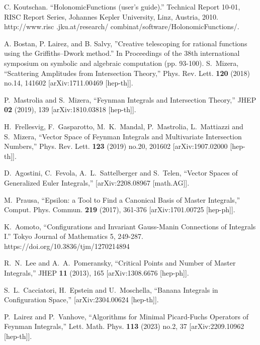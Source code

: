 \documentclass[a4paper,12pt]{article}
\numberwithin{equation}{section}
\numberwithin{figure}{section}
\begin{document}
\begin{thebibliography}{99}
 C. Koutschan. ``HolonomicFunctions (user's guide).'' Technical Report 10-01, RISC Report Series, Johannes Kepler University, Linz, Austria, 2010. http://www.risc
.jku.at/research/ combinat/software/HolonomicFunctions/.

 A. Bostan, P. Lairez, and B. Salvy,
  ''Creative telescoping for rational functions using the
  Griffiths--Dwork method.'' In Proceedings of the 38th international
  symposium on symbolic and algebraic computation (pp. 93-100). 
S.~Mizera,
``Scattering Amplitudes from Intersection Theory,''
Phys. Rev. Lett. \textbf{120} (2018) no.14, 141602
[arXiv:1711.00469 [hep-th]].

P.~Mastrolia and S.~Mizera,
``Feynman Integrals and Intersection Theory,''
JHEP \textbf{02} (2019), 139
[arXiv:1810.03818 [hep-th]].

H.~Frellesvig, F.~Gasparotto, M.~K.~Mandal, P.~Mastrolia, L.~Mattiazzi and S.~Mizera,
``Vector Space of Feynman Integrals and Multivariate Intersection Numbers,''
Phys. Rev. Lett. \textbf{123} (2019) no.20, 201602
[arXiv:1907.02000 [hep-th]].

D.~Agostini, C.~Fevola, A.~L.~Sattelberger and S.~Telen,
``Vector Spaces of Generalized Euler Integrals,''
[arXiv:2208.08967 [math.AG]].

  
M.~Prausa,
``Epsilon: a Tool to Find a Canonical Basis of Master Integrals,''
Comput. Phys. Commun. \textbf{219} (2017), 361-376
[arXiv:1701.00725 [hep-ph]].

  K.~Aomoto, ``Configurations and Invariant Gauss-Manin Connections of Integrals I.'' Tokyo Journal of Mathematics 5, 249-287. https://doi.org/10.3836/tjm/1270214894



R.~N.~Lee and A.~A.~Pomeransky,
``Critical Points and Number of Master Integrals,''
JHEP \textbf{11} (2013), 165
[arXiv:1308.6676 [hep-ph]].
  
S.~L.~Cacciatori, H.~Epstein and U.~Moschella,
``Banana Integrals in Configuration Space,''
[arXiv:2304.00624 [hep-th]].
  
P.~Lairez and P.~Vanhove,
``Algorithms for Minimal Picard-Fuchs Operators of Feynman Integrals,''
Lett. Math. Phys. \textbf{113} (2023) no.2, 37
[arXiv:2209.10962 [hep-th]].


\end{thebibliography}
\end{document}

